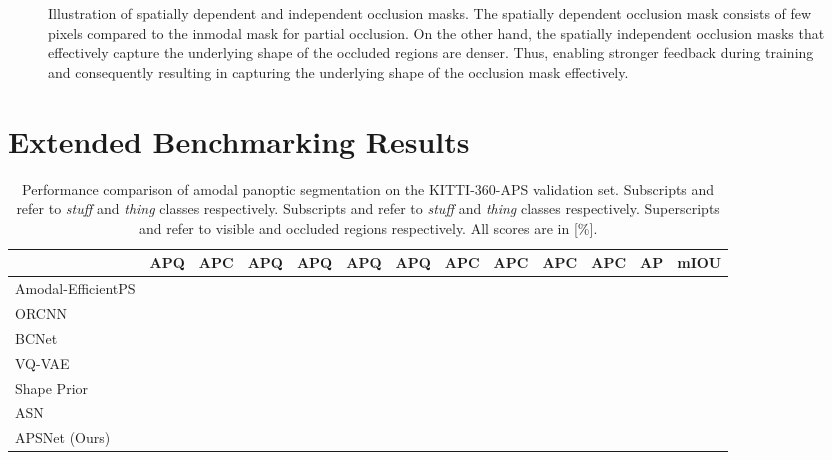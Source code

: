 \documentclass[10pt,twocolumn,letterpaper]{article}
\begin{document}
\begin{figure*}
{\begin{tabular}{P{0.4cm}P{3.0cm}P{3.0cm}P{3.0cm}P{3.0cm}}
\\
\end{tabular}}
\caption{Illustration of spatially dependent and independent occlusion masks. The spatially dependent occlusion mask consists of few pixels compared to the inmodal mask for partial occlusion. On the other hand, the spatially independent occlusion masks that effectively capture the underlying shape of the occluded regions are denser. Thus, enabling stronger feedback during training and consequently resulting in capturing the underlying shape of the occlusion mask effectively.}
\label{fig:occ_mask_egg}
\end{figure*}

\section{Extended Benchmarking Results}
\label{sec:supp_benchmark}
\begin{table*}
\footnotesize 
\centering
\begin{tabular}{p{2.8cm}|p{0.4cm}p{0.4cm}p{0.5cm}p{0.5cm}p{0.5cm}p{0.5cm}p{0.5cm}p{0.5cm}p{0.5cm}p{0.5cm}p{0.3cm}p{0.6cm}}
\toprule
&  APQ  & APC & APQ &APQ & APQ & APQ & APC&  APC & APC & APC & AP & mIOU\\
\midrule
Amodal-EfficientPS &  &  &  &  &  &  &  &  &  &  &  &  \\
ORCNN~\cite{follmann2019learning}  &  &  &  &  &  &  &  &  &  &  &  &   \\
BCNet~\cite{Ke_2021_CVPR}  &  &  &  &  &  &  &  &  &  &  &   &   \\
VQ-VAE~\cite{jang2020learning}  &  &   &  &  &  &  &  &  &  &  &  &    \\
Shape Prior~\cite{yuting2021amodal}  &  &   &  &  &  &  &  &  &  &  &  &  \\
ASN~\cite{qi2019amodal} &  &  &  &  &  &  &  &  &  &  &  &     \\
\midrule
\mbox{APSNet} (Ours)  &   &   &  &  & &   &  &   & & &  & \\
\bottomrule
\end{tabular}
\caption{Performance comparison of amodal panoptic segmentation on the KITTI-360-APS validation set. Subscripts  and  refer to \textit{stuff} and \textit{thing} classes respectively. Subscripts  and  refer to \textit{stuff} and \textit{thing} classes respectively. Superscripts  and  refer to visible and occluded regions respectively. All scores are in [\%].}
\label{tab:kittiEvaluations}
\end{table*}
\end{document}
